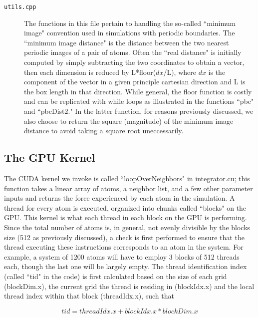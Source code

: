\documentclass[12pt]{article}
\begin{document}
\begin{description}
\item[\texttt{utils.cpp}]
The functions in this file pertain to handling the so-called ``minimum image" convention used in simulations with periodic boundaries.  The ``minimum image distance" is the distance between the two nearest periodic images of a pair of atoms.  Often the ``real distance" is initially computed by simply subtracting the two coordinates to obtain a vector, then each dimension is reduced by L*floor($dx$/L), where $dx$ is the component of the vector in a given principle cartesian direction and L is the box length in that direction.  While general, the floor function is costly and can be replicated with while loops as illustrated in the functions ``pbc" and ``pbcDist2."  In the latter function, for reasons previously discussed, we also choose to return the square (magnitude) of the minimum image distance to avoid taking a square root uneccessarily.

\end{description}

\subsection{The GPU Kernel}
\label{sec:gpukernel}
The CUDA kernel we invoke is called ``loopOverNeighbors" in integrator.cu; this function takes a linear array of atoms, a neighbor list, and
a few other parameter inputs and returns the force experienced by each atom in the simulation.  A thread for every atom is executed, organized into chunks called ``blocks" on the GPU.   This kernel is what each thread in each block  on the GPU is performing.   Since the total number of atoms is, in general, not evenly divisible by the blocks size (512 as previously discussed), a check is first performed to ensure that the thread executing these instructions corresponds to an atom in the system.  For example, a system of 1200 atoms will have to employ 3 blocks of 512 threads each, though the last one will be largely empty.  The thread identification index (called ``tid" in the code) is first calculated based on the size of each grid (blockDim.x), the current grid the thread is residing in (blockIdx.x) and the local thread index within that block (threadIdx.x), such that

\begin{equation}
	tid = threadIdx.x + blockIdx.x*blockDim.x
\end{equation}
\end{document}
